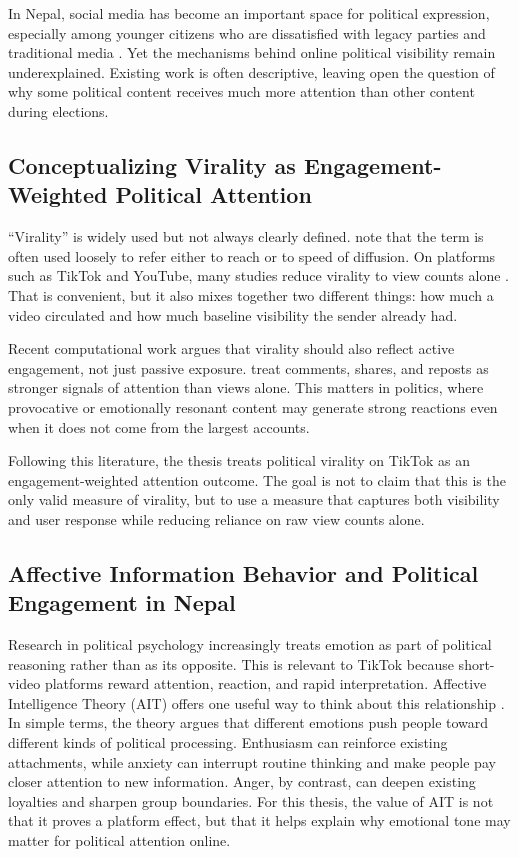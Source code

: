 \documentclass[12pt,a4paper]{report}
\begin{document}
In Nepal, social media has become an important space for political expression, especially among younger citizens who are dissatisfied with legacy parties and traditional media \parencite{dahal2023influence, bhandari2024}. Yet the mechanisms behind online political visibility remain underexplained. Existing work is often descriptive, leaving open the question of why some political content receives much more attention than other content during elections.

\subsection{Conceptualizing Virality as Engagement-Weighted Political Attention}
``Virality'' is widely used but not always clearly defined. \parencite{berger2012viral} note that the term is often used loosely to refer either to reach or to speed of diffusion. On platforms such as TikTok and YouTube, many studies reduce virality to view counts alone \parencite{nissenbaum2017internet}. That is convenient, but it also mixes together two different things: how much a video circulated and how much baseline visibility the sender already had.

Recent computational work argues that virality should also reflect active engagement, not just passive exposure. \parencite{sah2025decoding} treat comments, shares, and reposts as stronger signals of attention than views alone. This matters in politics, where provocative or emotionally resonant content may generate strong reactions even when it does not come from the largest accounts.

Following this literature, the thesis treats political virality on TikTok as an engagement-weighted attention outcome. The goal is not to claim that this is the only valid measure of virality, but to use a measure that captures both visibility and user response while reducing reliance on raw view counts alone.

\subsection{Affective Information Behavior and Political Engagement in Nepal}
Research in political psychology increasingly treats emotion as part of political reasoning rather than as its opposite. This is relevant to TikTok because short-video platforms reward attention, reaction, and rapid interpretation.
\newpage
Affective Intelligence Theory (AIT) offers one useful way to think about this relationship \parencite{marcus2013affective}. In simple terms, the theory argues that different emotions push people toward different kinds of political processing. Enthusiasm can reinforce existing attachments, while anxiety can interrupt routine thinking and make people pay closer attention to new information. Anger, by contrast, can deepen existing loyalties and sharpen group boundaries. For this thesis, the value of AIT is not that it proves a platform effect, but that it helps explain why emotional tone may matter for political attention online.
\end{document}
